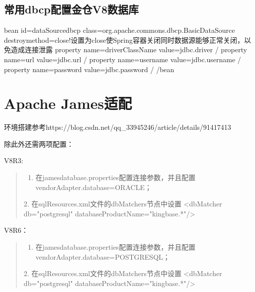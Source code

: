 \documentclass[letterpaper,10pt,english]{sphinxmanual}
\begin{document}
\subsection{常用dbcp配置金仓V8数据库}
\label{\detokenize{interface/DBCP:dbcpv8}}
\begin{sphinxVerbatim}[commandchars=\\\{\}]
\PYGZlt{}bean id=\PYGZdq{}dataSource\PYGZus{}dbcp\PYGZdq{}
      class=\PYGZdq{}org.apache.commons.dbcp.BasicDataSource\PYGZdq{} destroy\PYGZhy{}method=\PYGZdq{}close\PYGZdq{}\PYGZgt{}\PYGZlt{}!\PYGZhy{}\PYGZhy{}设置为close使Spring容器关闭同时数据源能够正常关闭，以免造成连接泄露 \PYGZhy{}\PYGZhy{}\PYGZgt{}
      \PYGZlt{}property name=\PYGZdq{}driverClassName\PYGZdq{} value=\PYGZdq{}\PYGZdl{}\PYGZob{}jdbc.driver\PYGZcb{}\PYGZdq{} /\PYGZgt{}
      \PYGZlt{}property name=\PYGZdq{}url\PYGZdq{} value=\PYGZdq{}\PYGZdl{}\PYGZob{}jdbc.url\PYGZcb{}\PYGZdq{} /\PYGZgt{}
      \PYGZlt{}property name=\PYGZdq{}username\PYGZdq{} value=\PYGZdq{}\PYGZdl{}\PYGZob{}jdbc.username\PYGZcb{}\PYGZdq{} /\PYGZgt{}
      \PYGZlt{}property name=\PYGZdq{}password\PYGZdq{} value=\PYGZdq{}\PYGZdl{}\PYGZob{}jdbc.password\PYGZcb{}\PYGZdq{} /\PYGZgt{}
\PYGZlt{}/bean\PYGZgt{}
\end{sphinxVerbatim}


\section{Apache James适配}
\label{\detokenize{interface/apache-james:apache-james}}\label{\detokenize{interface/apache-james::doc}}
环境搭建参考https://blog.csdn.net/qq\_33945246/article/details/91417413

除此外还需两项配置：

V8R3:
\begin{quote}
\begin{enumerate}
%
\item {} 
在james\sphinxhyphen{}database.properties配置连接参数，并且配置vendorAdapter.database=ORACLE；

\end{enumerate}

2. 在sqlResources.xml文件的dbMatchers节点中设置
<dbMatcher db="postgresql" databaseProductName="kingbase.*"/>
\end{quote}

V8R6：
\begin{quote}
\begin{enumerate}
%
\item {} 
在james\sphinxhyphen{}database.properties配置连接参数，并且配置vendorAdapter.database=POSTGRESQL；

\end{enumerate}

2. 在sqlResources.xml文件的dbMatchers节点中设置
<dbMatcher db="postgresql" databaseProductName="kingbase.*"/>
\end{quote}
\end{document}
